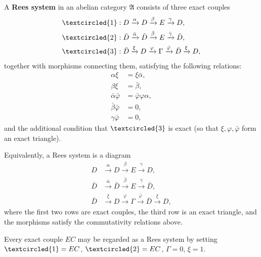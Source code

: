 A \textbf{Rees system} in an abelian category $\mathfrak{A}$ consists of three exact couples
\begin{align*}
\textcircled{1} &: D \xrightarrow{\alpha} D \xrightarrow{\beta} E \xrightarrow{\gamma} D, \\
\textcircled{2} &: \bar{D} \xrightarrow{\bar{\alpha}} \bar{D} \xrightarrow{\bar{\beta}} E \xrightarrow{\bar{\gamma}} \bar{D}, \\
\textcircled{3} &: \bar{D} \xrightarrow{\xi} D \xrightarrow{\varphi} \Gamma \xrightarrow{\bar{\varphi}} \bar{D} \xrightarrow{\xi} D,
\end{align*}
together with morphisms connecting them, satisfying the following relations:
\begin{align*}
\alpha \xi &= \xi \bar{\alpha}, \\
\beta \xi &= \bar{\beta}, \\
\bar{\alpha} \bar{\varphi} &= \bar{\varphi} \varphi \alpha, \\
\bar{\beta} \bar{\varphi} &= 0, \\
\gamma \bar{\varphi} &= 0,
\end{align*}
and the additional condition that $\textcircled{3}$ is exact (so that $\xi, \varphi, \bar{\varphi}$ form an exact triangle).

Equivalently, a Rees system is a diagram
\begin{align*}
D &\xrightarrow{\alpha} D \xrightarrow{\beta} E \xrightarrow{\gamma} D, \\
\bar{D} &\xrightarrow{\bar{\alpha}} \bar{D} \xrightarrow{\bar{\beta}} E \xrightarrow{\bar{\gamma}} \bar{D}, \\
\bar{D} &\xrightarrow{\xi} D \xrightarrow{\varphi} \Gamma \xrightarrow{\bar{\varphi}} \bar{D} \xrightarrow{\xi} D,
\end{align*}
where the first two rows are exact couples, the third row is an exact triangle, and the morphisms satisfy the commutativity relations above.

Every exact couple $EC$ may be regarded as a Rees system by setting $\textcircled{1} = EC$, $\textcircled{2} = EC$, $\Gamma = 0$, $\xi = 1$.
